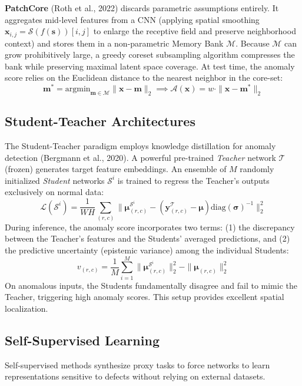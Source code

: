 \textbf{PatchCore} (Roth et al., 2022) discards parametric assumptions entirely. It aggregates mid-level features from a CNN (applying spatial smoothing $\boldsymbol{x}_{i,j} = \mathcal{S}(f(\boldsymbol{s}))[i,j]$ to enlarge the receptive field and preserve neighborhood context) and stores them in a non-parametric Memory Bank $\mathcal{M}$. Because $\mathcal{M}$ can grow prohibitively large, a greedy coreset subsampling algorithm compresses the bank while preserving maximal latent space coverage. At test time, the anomaly score relies on the Euclidean distance to the nearest neighbor in the core-set:
\begin{equation}
    \boldsymbol{m}^* = \text{argmin}_{\boldsymbol{m} \in \mathcal{M}} \| \boldsymbol{x} - \boldsymbol{m} \|_2 \implies \mathcal{A}(\boldsymbol{x}) = w \cdot \| \boldsymbol{x} - \boldsymbol{m}^* \|_2
\end{equation}

\subsection{Student-Teacher Architectures}
The Student-Teacher paradigm employs knowledge distillation for anomaly detection (Bergmann et al., 2020). A powerful pre-trained \textit{Teacher} network $\mathcal{T}$ (frozen) generates target feature embeddings. An ensemble of $M$ randomly initialized \textit{Student} networks $\mathcal{S}^i$ is trained to regress the Teacher's outputs exclusively on normal data:
\begin{equation}
    \mathcal{L}(\mathcal{S}^i) = \frac{1}{WH} \sum_{(r,c)} \| \boldsymbol{\mu}_{(r,c)}^{\mathcal{S}^i} - (\boldsymbol{y}_{(r,c)}^\mathcal{T} - \boldsymbol{\mu})\text{diag}(\boldsymbol{\sigma})^{-1} \|_2^2
\end{equation}
During inference, the anomaly score incorporates two terms: (1) the discrepancy between the Teacher's features and the Students' averaged predictions, and (2) the predictive uncertainty (epistemic variance) among the individual Students:
\begin{equation}
    v_{(r,c)} = \frac{1}{M} \sum_{i=1}^M \| \boldsymbol{\mu}_{(r,c)}^{\mathcal{S}^i} \|_2^2 - \| \boldsymbol{\mu}_{(r,c)} \|_2^2
\end{equation}
On anomalous inputs, the Students fundamentally disagree and fail to mimic the Teacher, triggering high anomaly scores. This setup provides excellent spatial localization.

\subsection{Self-Supervised Learning}
Self-supervised methods synthesize proxy tasks to force networks to learn representations sensitive to defects without relying on external datasets.

